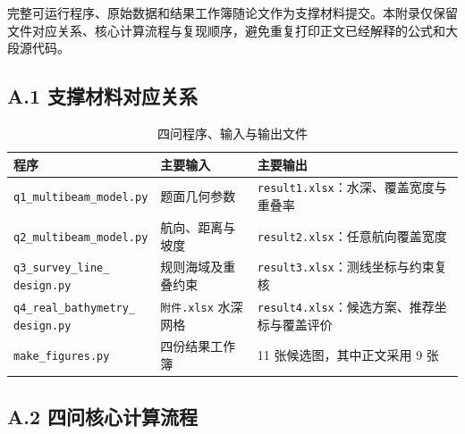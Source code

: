 \vspace{0.8em}

完整可运行程序、原始数据和结果工作簿随论文作为支撑材料提交。本附录仅保留文件对应关系、核心计算流程与复现顺序，避免重复打印正文已经解释的公式和大段源代码。

\subsection*{A.1 支撑材料对应关系}

\begin{table}[H]
  \centering
  \caption{四问程序、输入与输出文件}
  \small
  \begin{tabular}{p{}p{}p{}}
    \toprule
    \textbf{程序} & \textbf{主要输入} & \textbf{主要输出} \\
    \midrule
    \texttt{q1\_multibeam\_model.py} & 题面几何参数 & \texttt{result1.xlsx}：水深、覆盖宽度与重叠率 \\
    \texttt{q2\_multibeam\_model.py} & 航向、距离与坡度 & \texttt{result2.xlsx}：任意航向覆盖宽度 \\
    \shortstack[l]{\texttt{q3\_survey\_line\_}\\\texttt{design.py}} & 规则海域及重叠约束 & \texttt{result3.xlsx}：测线坐标与约束复核 \\
    \shortstack[l]{\texttt{q4\_real\_bathymetry\_}\\\texttt{design.py}} & \texttt{附件.xlsx} 水深网格 & \texttt{result4.xlsx}：候选方案、推荐坐标与覆盖评价 \\
    \texttt{make\_figures.py} & 四份结果工作簿 & 11 张候选图，其中正文采用 9 张 \\
    \bottomrule
  \end{tabular}
\end{table}

\subsection*{A.2 四问核心计算流程}

